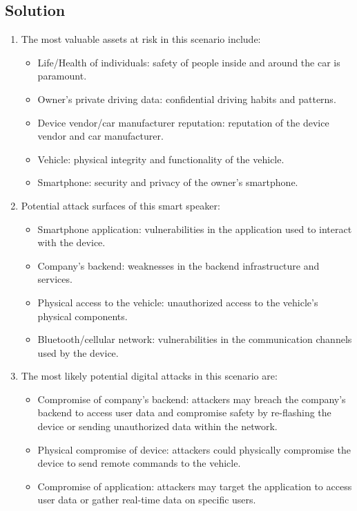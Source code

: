\subsection{Solution}
\begin{enumerate}
    \item The most valuable assets at risk in this scenario include:
        \begin{itemize}
            \item Life/Health of individuals: safety of people inside and around the car is paramount.
            \item Owner's private driving data: confidential driving habits and patterns.
            \item Device vendor/car manufacturer reputation: reputation of the device vendor and car manufacturer.
            \item Vehicle: physical integrity and functionality of the vehicle.
            \item Smartphone: security and privacy of the owner's smartphone.
        \end{itemize}
    \item  Potential attack surfaces of this smart speaker:
        \begin{itemize}
            \item Smartphone application: vulnerabilities in the application used to interact with the device.
            \item Company's backend: weaknesses in the backend infrastructure and services.
            \item Physical access to the vehicle: unauthorized access to the vehicle's physical components.
            \item Bluetooth/cellular network: vulnerabilities in the communication channels used by the device.
        \end{itemize}
    \item The most likely potential digital attacks in this scenario are:
        \begin{itemize}
            \item Compromise of company's backend: attackers may breach the company's backend to access user data and compromise safety by re-flashing the device or sending unauthorized data within the network.
            \item Physical compromise of device: attackers could physically compromise the device to send remote commands to the vehicle.
            \item Compromise of application: attackers may target the application to access user data or gather real-time data on specific users.
        \end{itemize}
\end{enumerate}